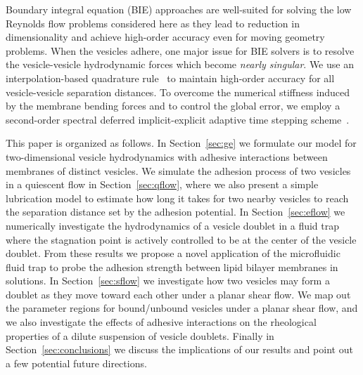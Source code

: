 \documentclass[prf,superscriptaddress,showkeys,longbibliography]{revtex4-1}
\begin{document}
Boundary integral equation (BIE) approaches are well-suited for solving
the low Reynolds flow problems considered here as they lead to reduction
in dimensionality and achieve high-order accuracy even for moving
geometry problems. When the vesicles adhere, one major issue for BIE
solvers is to resolve the vesicle-vesicle hydrodynamic forces which
become {\em nearly singular}.  We use an interpolation-based quadrature
rule~\cite{qua-bir2014} to maintain high-order accuracy for all
vesicle-vesicle separation distances.  To overcome the numerical
stiffness induced by the membrane bending forces and to control the
global error, we employ a second-order spectral deferred
implicit-explicit adaptive time stepping
scheme~\cite{quaife2016adaptive}. 

This paper is organized as follows. In Section~\ref{sec:ge} we formulate
our model for two-dimensional vesicle hydrodynamics with adhesive
interactions between membranes of distinct vesicles.  We simulate the
adhesion process of two vesicles in a quiescent flow in
Section~\ref{sec:qflow}, where we also present a simple lubrication
model to estimate how long it takes for two nearby vesicles to reach the
separation distance set by the adhesion potential.  In
Section~\ref{sec:eflow} we numerically investigate the hydrodynamics of
a vesicle doublet in a fluid trap where the stagnation point is actively
controlled to be at the center of the vesicle doublet. From these
results we propose a novel application of the microfluidic fluid trap to
probe the adhesion strength between lipid bilayer membranes in
solutions. In Section~\ref{sec:sflow} we investigate how two vesicles
may form a doublet as they move toward each other under a planar shear
flow.  We map out the parameter regions for bound/unbound vesicles under
a planar shear flow, and we also investigate the effects of adhesive
interactions on the rheological properties of a dilute suspension of
vesicle doublets.  Finally in Section~\ref{sec:conclusions} we discuss
the implications of our results and point out a few potential future
directions.

\end{document}
